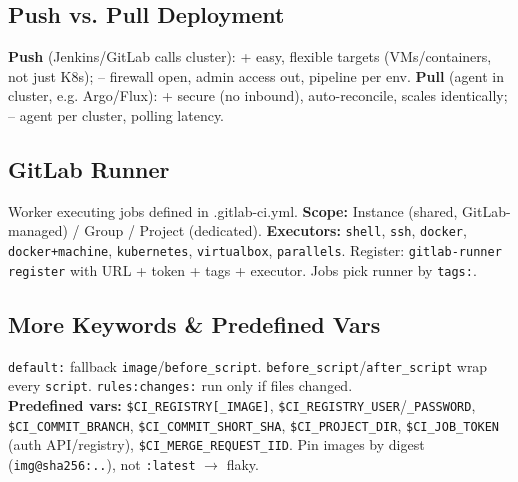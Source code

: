 \subsection{Push vs. Pull Deployment}
\textbf{Push} (Jenkins/GitLab calls cluster): + easy, flexible targets (VMs/containers, not just K8s); -- firewall open, admin access out, pipeline per env. \textbf{Pull} (agent in cluster, e.g. Argo/Flux): + secure (no inbound), auto-reconcile, scales identically; -- agent per cluster, polling latency.

\subsection{GitLab Runner}
Worker executing jobs defined in .gitlab-ci.yml. \textbf{Scope:} Instance (shared, GitLab-managed) / Group / Project (dedicated). \textbf{Executors:} \texttt{shell}, \texttt{ssh}, \texttt{docker}, \texttt{docker+machine}, \texttt{kubernetes}, \texttt{virtualbox}, \texttt{parallels}. Register: \texttt{gitlab-runner register} with URL + token + tags + executor. Jobs pick runner by \texttt{tags:}.

\subsection{More Keywords \& Predefined Vars}
\texttt{default:} fallback \texttt{image}/\texttt{before\_script}. \texttt{before\_script}/\texttt{after\_script} wrap every \texttt{script}. \texttt{rules:changes:} run only if files changed. \\
\textbf{Predefined vars:} \texttt{\$CI\_REGISTRY[\_IMAGE]}, \texttt{\$CI\_REGISTRY\_USER}/\texttt{\_PASSWORD}, \texttt{\$CI\_COMMIT\_BRANCH}, \texttt{\$CI\_COMMIT\_SHORT\_SHA}, \texttt{\$CI\_PROJECT\_DIR}, \texttt{\$CI\_JOB\_TOKEN} (auth API/registry), \texttt{\$CI\_MERGE\_REQUEST\_IID}. Pin images by digest (\texttt{img@sha256:..}), not \texttt{:latest} $\rightarrow$ flaky.
